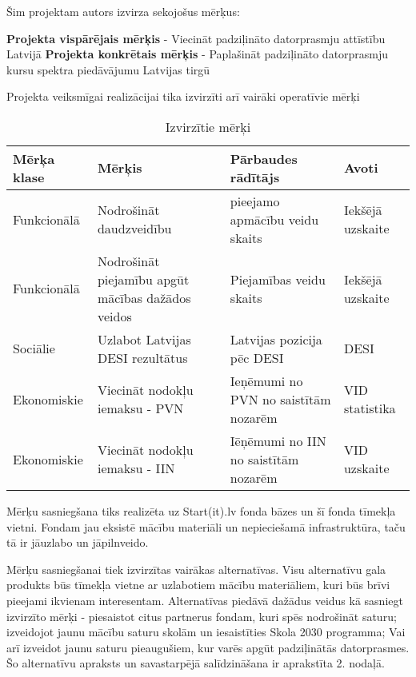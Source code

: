 \par
Šim projektam autors izvirza sekojošus mērķus:
\par
\textbf{Projekta vispārējais mērķis} - Viecināt padziļināto datorprasmju attīstību Latvijā
\textbf{Projekta konkrētais mērķis} - Paplašināt padziļināto datorprasmju kursu spektra piedāvājumu Latvijas tirgū
\par
Projekta veiksmīgai realizācijai tika izvirzīti arī vairāki operatīvie mērķi
\begin{table}[!ht]
    \centering
    \begin{tabular}{|p{}|p{}|p{}|p{}|}
        \hline
        \textbf{Mērķa klase} & \textbf{Mērķis} & \textbf{Pārbaudes rādītājs} & \textbf{Avoti} \\
        \hline
        Funkcionālā & Nodrošināt daudzveidību & pieejamo apmācību veidu skaits & Iekšējā uzskaite \\
        \hline
        Funkcionālā & Nodrošināt piejamību apgūt mācības dažādos veidos & Piejamības veidu skaits & Iekšējā uzskaite \\
        \hline
        Sociālie & Uzlabot Latvijas DESI rezultātus & Latvijas pozicija pēc DESI & DESI \\
        \hline
        Ekonomiskie & Viecināt nodokļu iemaksu - PVN & Ieņēmumi no PVN no saistītām nozarēm & VID statistika \\
        \hline
        Ekonomiskie & Viecināt nodokļu iemaksu - IIN & Iēņēmumi no IIN no saistītām nozarēm & VID uzskaite \\
        \hline
    \end{tabular}
    \caption{Izvirzītie mērķi}
    \label{table:merki}
\end{table}
\par
Mērķu sasniegšana tiks realizēta uz Start(it).lv fonda bāzes un šī fonda tīmekļa vietni. Fondam jau
eksistē mācību materiāli un nepieciešamā infrastruktūra, taču tā ir jāuzlabo un jāpilnveido.
\par
Mērķu sasniegšanai tiek izvirzītas vairākas alternatīvas. Visu alternatīvu gala produkts būs tīmekļa vietne
ar uzlabotiem mācību materiāliem, kuri būs brīvi pieejami ikvienam interesentam. Alternatīvas piedāvā dažādus
veidus kā sasniegt izvirzīto mērķi - piesaistot citus partnerus fondam, kuri spēs nodrošināt saturu; 
izveidojot jaunu mācību saturu skolām un iesaistīties Skola 2030 programma; Vai arī izveidot jaunu saturu
pieaugušiem, kur varēs apgūt padziļinātās datorprasmes. Šo alternatīvu apraksts un savastarpējā salīdzināšana 
ir aprakstīta 2. nodaļā.